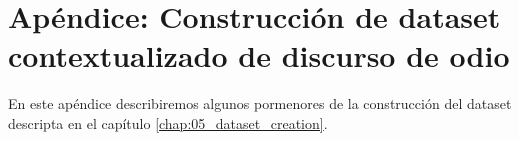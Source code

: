 \chapter{Apéndice: Construcción de dataset contextualizado de discurso de odio}

En este apéndice describiremos algunos pormenores de la construcción del dataset descripta en el capítulo \ref{chap:05_dataset_creation}.



